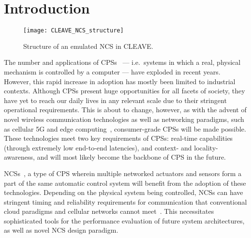 \section{Introduction}\label{sec:intro}

\begin{figure*}
    \centering
    \texttt{[image: CLEAVE\_NCS\_structure]}
    \caption{
        Structure of an emulated \acl*{NCS} in \acs*{CLEAVE}.
    }\label{fig:cleave:ncs:struct}
\end{figure*}

The number and applications of \acp{CPS}~\cite{Rajkumar2010CPS} --- i.e.\ systems in which a real, physical mechanism is controlled by a computer --- have exploded in recent years.
However, this rapid increase in adoption has mostly been limited to industrial contexts.
Although \acp{CPS} present huge opportunities for all facets of society, they have yet to reach our daily lives in any relevant scale due to their stringent operational requirements.
This is about to change, however, as with the advent of novel wireless communication technologies as well as networking paradigms, such as cellular 5G and edge computing~\cite{Satya2017Emergence}, consumer-grade \acp{CPS} will be made possible.
These technologies meet two key requirements of \acp{CPS}: real-time capabilities (through extremely low end-to-end latencies), and context- and locality-awareness, and will most likely become the backbone of \ac{CPS} in the future.

\acp{NCS}~\cite{Gupta2010NCSOverview}, a type of \ac{CPS} wherein multiple networked actuators and sensors form a part of the same automatic control system will benefit from the adoption of these technologies.
Depending on the physical system being controlled, \acp{NCS} can have stringent timing and reliability requirements for communication that conventional cloud paradigms and cellular networks cannot meet~\cite{Wan2020Efficient}.
This necessitates sophisticated tools for the performance evaluation of future system architectures, as well as novel NCS design paradigm.


